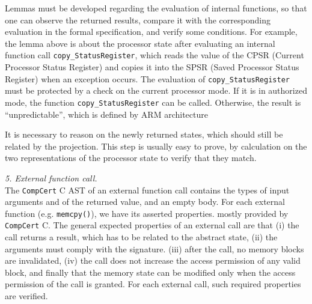 \documentclass{llncs}
\newcommand{\compcert}{\texttt{CompCert}\xspace}
\begin{document}
  Lemmas must be developed regarding the evaluation of internal
  functions, so that one can observe the returned results,
  compare it with the corresponding evaluation in the formal
  specification, and verify some conditions.  For example, the lemma
  above is about the processor state after evaluating an internal
  function call \texttt{copy\_StatusRegister}, which reads the value of
  the CPSR (Current Processor Status Register) and copies it into
  the SPSR (Saved Processor Status Register) when an exception occurs.  The
  evaluation of \texttt{copy\_StatusRegister} must be protected by a
  check on the current processor mode.  If it is in authorized mode, the
  function \texttt{copy\_StatusRegister} can be called.  Otherwise, the
  result is ``unpredictable'', which is defined by ARM architecture

  It is necessary to reason on the newly returned states, which
  should still be related by the projection.  This step is usually easy
  to prove, by calculation on the two representations of the processor
  state to verify that they match.

\medskip\noindent
  \textit{5. External function call.}\\
  The \compcert C AST of an external function call contains the types
  of input arguments and of the returned value, and an empty body.
  For each external function (e.g. \texttt{memcpy()}), we have its
  asserted properties. mostly provided by \compcert C.  The general
  expected properties of an external call are that (i) the call
  returns a result, which has to be related to the abstract state,
  (ii) the arguments must comply with the signature.  (iii) after the
  call, no memory blocks are invalidated, (iv) the call does not
  increase the access permission of any valid block, and finally that
  the memory state can be modified only when the access permission of
  the call is granted. For each external call, such required
  properties are verified.

\end{document}
